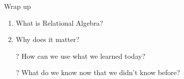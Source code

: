 \documentclass[aspectratio=169]{beamer}
\begin{document}

\begin{frame}{Wrap up}
\begin{enumerate}
\item What is Relational Algebra?
\item Why does it matter?
\end{enumerate}

\begin{itemize}
	\item[?] How can we use what we learned today?
	\vspace{2em}
	\item[?] What do we know now that we didn't know before?
\end{itemize}


\end{frame}
\end{document}
